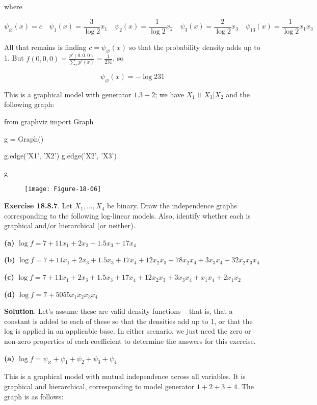 where

\[ \psi_\varnothing(x) = c
\quad
\psi_1(x) = \frac{3}{\log 2} x_1
\quad
\psi_2(x) = \frac{1}{\log 2} x_2
\quad
\psi_3(x) = \frac{2}{\log 2} x_3
\quad
\psi_{13}(x) = \frac{1}{\log 2} x_1 x_3
\]

All that remains is finding \(c = \psi_\varnothing(x)\) so that the
probability density adds up to 1. But
\(f(0, 0, 0) = \frac{p'(0, 0, 0)}{\sum_x p'(x)} = \frac{1}{231}\), so

\[ \psi_\varnothing(x) = - \log 231\]

This is a graphical model with generator \(1.3 + 2\); we have
\(X_1 \text{ ⫫ } X_3 | X_2\) and the following graph:

\begin{python}
from graphviz import Graph

g = Graph()

g.edge('X1', 'X2')
g.edge('X2', 'X3')

g
\end{python}
 
\begin{figure}[H]
\texttt{[image: Figure-18-06]}
\end{figure}

\textbf{Exercise 18.8.7}. Let \(X_1, \dots, X_4\) be binary. Draw the
independence graphs corresponding to the following log-linear models.
Also, identify whether each is graphical and/or hierarchical (or
neither).

\textbf{(a)} \(\log f = 7 + 11 x_1 + 2 x_2 + 1.5 x_3 + 17 x_4\)

\textbf{(b)}
\(\log f = 7 + 11 x_1 + 2 x_3 + 1.5 x_3 + 17 x_4 + 12 x_2 x_3 + 78 x_2 x_4 + 3 x_3 x_4 + 32 x_2 x_3 x_4\)

\textbf{(c)}
\(\log f = 7 + 11 x_1 + 2 x_3 + 1.5 x_3 + 17 x_4 + 12 x_2 x_3 + 3 x_3 x_4 + x_1 x_4 + 2 x_1 x_2\)

\textbf{(d)} \(\log f = 7 + 5055 x_1 x_2 x_3 x_4\)

\textbf{Solution}. Let's assume these are valid density functions --
that is, that a constant is added to each of these so that the densities
add up to 1, or that the log is applied in an applicable base. In either
scenario, we just need the zero or non-zero properties of each
coefficient to determine the answers for this exercise.

\textbf{(a)}
\(\log f = \psi_\varnothing + \psi_1 + \psi_2 + \psi_3 + \psi_4\)

This is a graphical model with mutual independence across all variables.
It is graphical and hierarchical, corresponding to model generator
\(1 + 2 + 3 + 4\). The graph is as follows:


